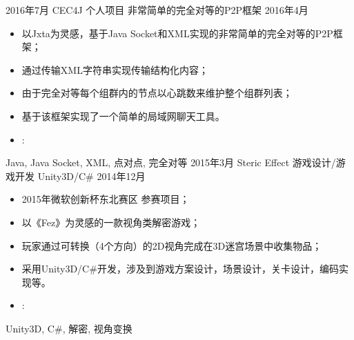 %
%


\begin{experiences}
 \experience
    {2016年7月}   { CEC4J}{ 个人项目}{ 非常简单的完全对等的P2P框架}
    { 2016年4月} {
                      \begin{itemize}
                        \item 以Jxta为灵感，基于Java Socket和XML实现的非常简单的完全对等的P2P框架；
                        \item 通过传输XML字符串实现传输结构化内容；
                        \item 由于完全对等每个组群内的节点以心跳数来维护整个组群列表；
                        \item 基于该框架实现了一个简单的局域网聊天工具。
                        \item \faGithub: 
                      \end{itemize}
                    }
                    {Java, Java Socket, XML, 点对点, 完全对等}
  \emptySeparator
  \experience
    {2015年3月} { Steric Effect}{ 游戏设计/游戏开发}{ Unity3D/C\#}
    { 2014年12月}    {
                      \begin{itemize}
                        \item 2015年微软创新杯东北赛区 参赛项目；
                        \item 以《Fez》为灵感的一款视角类解密游戏；
                        \item 玩家通过可转换（4个方向）的2D视角完成在3D迷宫场景中收集物品；
                        \item 采用Unity3D/C\#开发，涉及到游戏方案设计，场景设计，关卡设计，编码实现等。
                        \item \faGithub: 
                      \end{itemize}
                    }
                    {Unity3D, C\#, 解密, 视角变换}
\end{experiences}
